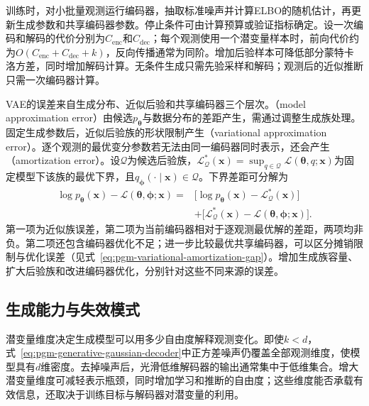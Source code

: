 训练时，对小批量观测运行编码器，抽取标准噪声并计算ELBO的随机估计，再更新生成参数和共享编码器参数。停止条件可由计算预算或验证指标确定。设一次编码和解码的代价分别为$C_{\mathrm{enc}}$和$C_{\mathrm{dec}}$；每个观测使用一个潜变量样本时，前向代价约为$O(C_{\mathrm{enc}}+C_{\mathrm{dec}}+k)$，反向传播通常为同阶。增加后验样本可降低部分蒙特卡洛方差，同时增加解码计算。无条件生成只需先验采样和解码；观测后的近似推断只需一次编码器计算。

VAE的误差来自生成分布、近似后验和共享编码器三个层次。（model approximation error）由候选$p_{\bm{\theta}}$与数据分布的差距产生，需通过调整生成族处理。固定生成参数后，近似后验族的形状限制产生（variational approximation error）。逐个观测的最优变分参数若无法由同一编码器同时表示，还会产生（amortization error）。设$\mathcal{Q}$为候选后验族，$\mathcal{L}_{\mathcal{Q}}^*(\bm{x})=\sup_{q\in\mathcal{Q}}\mathcal{L}(\bm{\theta},q;\bm{x})$为固定模型下该族的最优下界，且$q_{\bm{\phi}}(\cdot\mid\bm{x})\in\mathcal{Q}$。下界差距可分解为
\begin{equation}
  \label{eq:pgm-generative-inference-gaps}
  \begin{aligned}
    \log p_{\bm{\theta}}(\bm{x})
      -\mathcal{L}(\bm{\theta},\bm{\phi};\bm{x})
    ={}&\bigl[\log p_{\bm{\theta}}(\bm{x})
             -\mathcal{L}_{\mathcal{Q}}^*(\bm{x})\bigr]\\
       &+\bigl[\mathcal{L}_{\mathcal{Q}}^*(\bm{x})
             -\mathcal{L}(\bm{\theta},\bm{\phi};\bm{x})\bigr].
  \end{aligned}
\end{equation}
第一项为近似族误差，第二项为当前编码器相对于逐观测最优解的差距，两项均非负。第二项还包含编码器优化不足；进一步比较最优共享编码器，可以区分摊销限制与优化误差（见式~\eqref{eq:pgm-variational-amortization-gap}）。增加生成族容量、扩大后验族和改进编码器优化，分别针对这些不同来源的误差。

\subsection{生成能力与失效模式}
\label{sec:pgm-generative-vae-failure}

潜变量维度决定生成模型可以用多少自由度解释观测变化。即使$k<d$，式~\eqref{eq:pgm-generative-gaussian-decoder}中正方差噪声仍覆盖全部观测维度，使模型具有$d$维密度。去掉噪声后，光滑低维解码器的输出通常集中于低维集合。增大潜变量维度可减轻表示瓶颈，同时增加学习和推断的自由度；这些维度能否承载有效信息，还取决于训练目标与解码器对潜变量的利用。

